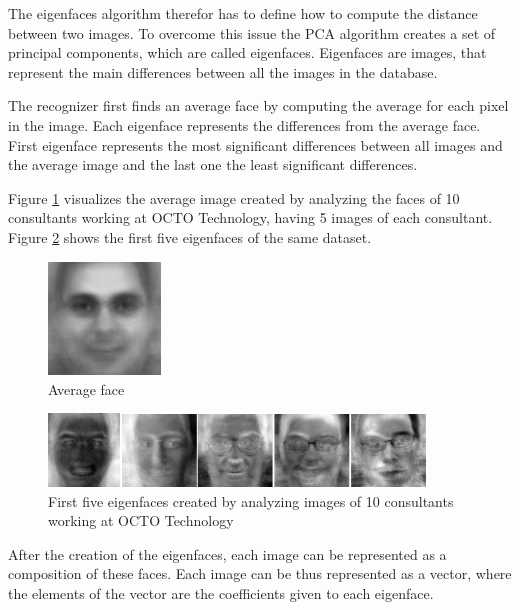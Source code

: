 The eigenfaces algorithm therefor has to define how to compute the distance between two images. To overcome this issue the PCA algorithm creates a set of principal components, which are called eigenfaces. Eigenfaces are images, that represent the main differences between all the images in the database.

The recognizer first finds an average face by computing the average for each pixel in the image. Each eigenface represents the differences from the average face. First eigenface represents the most significant differences between all images and the average image and the last one the least significant differences.

Figure \ref{fig:avarage_face} visualizes the average image created by analyzing the faces of 10 consultants working at OCTO Technology, having 5 images of each consultant. Figure \ref{fig:eigenfaces} shows the first five eigenfaces of the same dataset.

\begin{figure}[h]
\begin{center}
\includegraphics[width=3cm]{figures/avg}
\caption{Average face}
\label{fig:avarage_face}
\end{center}
\end{figure}

\begin{figure}[h]
\begin{center}
\includegraphics[width=10cm]{figures/eigenfaces}
\caption{First five eigenfaces created by analyzing images of 10 consultants working at OCTO Technology}
\label{fig:eigenfaces}
\end{center}
\end{figure}

After the creation of the eigenfaces, each image can be represented as a composition of these faces. Each image can be thus represented as a vector, where the elements of the vector are the coefficients given to each eigenface.

